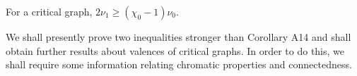 For a critical graph, $2\nu_1 \geq (\chi_0 - 1)\nu_0$.

We shall presently prove two inequalities stronger than Corollary A14 and shall obtain further results about valences of critical graphs. In order to do this, we shall require some information relating chromatic properties and connectedness.
